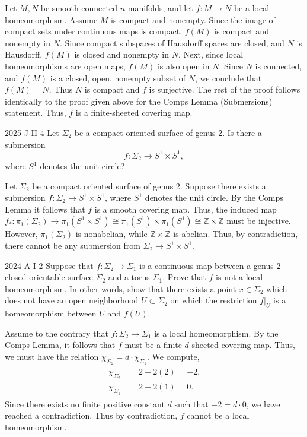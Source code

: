 \documentclass{article}
\begin{document}
	Let $M, N$ be smooth connected $n$-manifolds, and let $f: M \to N$ be a local homeomorphism. Assume $M$ is compact and nonempty. Since the image of compact sets under continuous maps is compact, $f(M)$ is compact and nonempty in $N$. Since compact subspaces of Hausdorff spaces are closed, and $N$ is Hausdorff, $f(M)$ is closed and nonempty in $N$. Next, since local homeomorphisms are open maps, $f(M)$ is also open in $N$. Since $N$ is connected, and $f(M)$ is a closed, open, nonempty subset of $N$, we conclude that $f(M) = N$. Thus $N$ is compact and $f$ is surjective. The rest of the proof follows identically to the proof given above for the Comps Lemma (Submersions) statement. Thus, $f$ is a finite-sheeted covering map. 
	
	
	\begin{prb}{2025-J-II-4}
		Let $\Sigma_{2}$ be a compact oriented surface of genus 2. Is there a submersion 
		\begin{equation*}
			f: \Sigma_{2} \to S^{1} \times S^{1}, 
		\end{equation*}
		where $S^{1}$ denotes the unit circle?
	\end{prb}
	Let $\Sigma_{2}$ be a compact oriented surface of genus 2. Suppose there exists a submersion $f: \Sigma_{2} \to S^{1} \times S^{1}$, where $S^{1}$ denotes the unit circle. By the Comps Lemma it follows that $f$ is a smooth covering map. Thus, the induced map $f_{\ast}: \pi_{1}(\Sigma_{2}) \to \pi_{1}(S^{1} \times S^{1}) \cong \pi_{1}(S^{1})\times \pi_{1}(S^{1}) \cong \mathbb{Z} \times \mathbb{Z}$ must be injective. However, $\pi_{1}(\Sigma_{2})$ is nonabelian, while $\mathbb{Z} \times \mathbb{Z}$ is abelian. Thus, by contradiction, there cannot be any submersion from $\Sigma_{2} \to S^{1} \times S^{1}$. 
	
	\begin{prb}{2024-A-I-2}
		Suppose that $f: \Sigma_2 \to \Sigma_1$ is a continuous map between a genus 2 closed orientable surface $\Sigma_2$ and a torus $\Sigma_1$. Prove that $f$ is not a local homeomorphism. In other words, show that there exists a point $x \in \Sigma_2$ which does not have an open neighborhood $U \subset \Sigma_2$ on which the restriction $f|_U$ is a homeomorphism between $U$ and $f(U)$. 	
	\end{prb}
	Assume to the contrary that $f: \Sigma_2 \to \Sigma_1$ is a local homeomorphism. By the Comps Lemma, it follows that $f$ must be a finite $d$-sheeted covering map. Thus, we must have the relation $\chi_{\Sigma_2} = d \cdot \chi_{\Sigma_1}$. We compute, 
	\begin{align*}
		\begin{split}
			\chi_{\Sigma_{2}} &= 2 - 2(2) = -2. \\
			\chi_{\Sigma_{1}} &= 2 - 2(1) =0. 
		\end{split} 
	\end{align*}
	Since there exists no finite positive constant $d$ such that $-2 = d \cdot 0$, we have reached a contradiction. Thus by contradiction, $f$ cannot be a local homeomorphism. 
	
\end{document}
